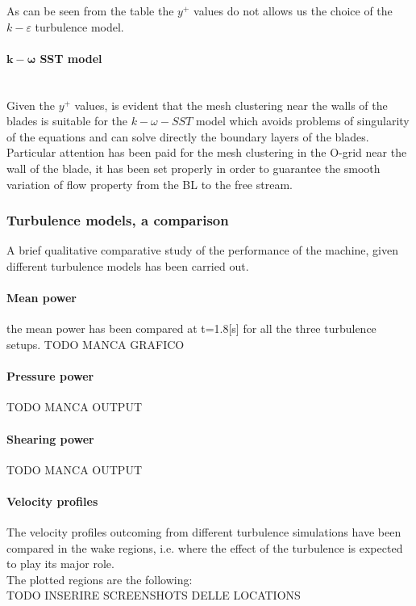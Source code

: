 \documentclass[a4paper,12pt]{article}
\newcommand{\todo}{\colorbox{cyan!60}{TODO}}
\begin{document}
As can be seen from the table the $y^+$ values do not allows us the choice of the $k-\varepsilon$ turbulence model.\\

\paragraph{$\bm{k}-\bm{\omega} $ SST model}  \mbox{}\\
Given the $y^+$ values, is evident that the mesh clustering near the walls of the blades is suitable for the $k-\omega-SST$ model which avoids problems of singularity of the equations and can solve directly the boundary layers of the blades.\\
Particular attention has been paid for the mesh clustering in the O-grid near the wall of the blade, it has been set properly in order to guarantee the smooth variation of flow property from the BL to the free stream.

\subsubsection{Turbulence models, a comparison}
A brief qualitative comparative study of the performance of the machine, given different turbulence models has been carried out.
\paragraph{Mean power}
the mean power has been compared at t=1.8[s] for all the three turbulence setups. 
\todo{} MANCA GRAFICO
\paragraph{Pressure power}
\todo{} MANCA OUTPUT
\paragraph{Shearing power}
\todo{} MANCA OUTPUT
\paragraph{Velocity profiles}
The velocity profiles outcoming from different turbulence simulations have been compared in the wake regions, i.e. where the effect of the turbulence is expected to play its major role.\\
The plotted regions are the following:\\
\todo{} INSERIRE SCREENSHOTS DELLE LOCATIONS
\end{document}
